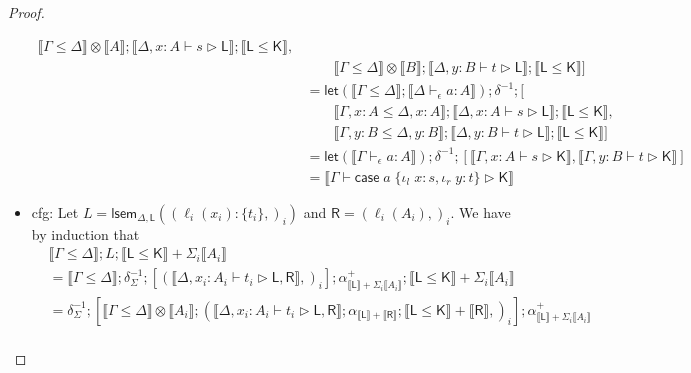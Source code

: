 \documentclass[acmsmall,screen,review]{acmart}
\newcommand{\ms}[1]{\ensuremath{\mathsf{#1}}}
\newcommand{\lto}{:}
\newcommand{\linl}[1]{\iota_l\;{#1}}
\newcommand{\linr}[1]{\iota_r\;{#1}}
\newcommand{\caseexpr}[5]{\ms{case}\;#1\;\{\linl{#2} \lto #3, \linr{#4} \lto #5\}}
\newcommand{\wbranch}[3]{#1(#2) \lto \{#3\}}
\newcommand{\bhyp}[2]{#1 : #2}
\newcommand{\hasty}[4]{#1 \vdash_{#2} #3: {#4}}
\newcommand{\haslb}[3]{#1 \vdash #2 \rhd #3}
\newcommand{\brle}[1]{{\textsf{#1}}}
\newcommand{\dnt}[1]{\llbracket{#1}\rrbracket}
\newcommand{\loopmor}[3]{\ms{lsem}_{#1, #3}(#2)}
\newcommand{\lmor}[1]{\ms{let}(#1)}
\begin{document}
\begin{proof}
\begin{itemize}
\begin{equation}
\begin{aligned}
             \dnt{\Gamma \leq \Delta} \otimes \dnt{A}
               ; \dnt{\haslb{\Delta, \bhyp{x}{A}}{s}{\ms{L}}}
               ; \dnt{\ms{L} \leq \ms{K}}, \\ & \qquad
             \dnt{\Gamma \leq \Delta} \otimes \dnt{B}
               ; \dnt{\haslb{\Delta, \bhyp{y}{B}}{t}{\ms{L}}}
               ; \dnt{\ms{L} \leq \ms{K}}
          ] \\
        & = \lmor{\dnt{\Gamma \leq \Delta} ; \dnt{\hasty{\Delta}{\epsilon}{a}{A}}}
           ; \delta^{-1}
           ; [ \\ & \qquad 
              \dnt{\Gamma, \bhyp{x}{A} \leq \Delta, \bhyp{x}{A}}
                ; \dnt{\haslb{\Delta, \bhyp{x}{A}}{s}{\ms{L}}}
                ; \dnt{\ms{L} \leq \ms{K}}, \\ & \qquad
              \dnt{\Gamma, \bhyp{y}{B} \leq \Delta, \bhyp{y}{B}}
                ; \dnt{\haslb{\Delta, \bhyp{y}{B}}{t}{\ms{L}}}
                ; \dnt{\ms{L} \leq \ms{K}}
           ]
            \\
        & = \lmor{\dnt{\hasty{\Gamma}{\epsilon}{a}{A}}}
          ; \delta^{-1}
          ; [ 
            \dnt{\haslb{\Gamma, \bhyp{x}{A}}{s}{\ms{K}}},
            \dnt{\haslb{\Gamma, \bhyp{y}{B}}{t}{\ms{K}}}
          ] \\
        & = \dnt{\haslb{\Gamma}{\caseexpr{a}{x}{s}{y}{t}}{\ms{K}}}
      \end{aligned}
    \end{equation}
    \item \brle{cfg}: Let $L = \loopmor{\Delta}{(\wbranch{\ell_i}{x_i}{t_i},)_i}{\ms{L}}$ and
    $\ms{R} = (\ell_i(A_i),)_i$. We have by induction that
    \begin{equation}
      \begin{aligned}
        & \dnt{\Gamma \leq \Delta} ; L ; \dnt{\ms{L} \leq \ms{K}} + \Sigma_i\dnt{A_i} \\
        & = \dnt{\Gamma \leq \Delta} 
          ; \delta^{-1}_{\Sigma}
          ; [(\dnt{\haslb{\Delta, \bhyp{x_i}{A_i}}{t_i}{\ms{L}, \ms{R}}},)_i]
          ; \alpha^+_{\dnt{\ms{L}} + \Sigma_i\dnt{A_i}}
          ; \dnt{\ms{L} \leq \ms{K}} + \Sigma_i\dnt{A_i} \\
        & = \delta^{-1}_{\Sigma}
          ; [
            \dnt{\Gamma \leq \Delta} \otimes \dnt{A_i}
            ; (\dnt{\haslb{\Delta, \bhyp{x_i}{A_i}}{t_i}{\ms{L}, \ms{R}}}
            ; \alpha_{\dnt{\ms{L}} + \dnt{\ms{R}}}
            ; \dnt{\ms{L} \leq \ms{K}} + \dnt{\ms{R}},)_i]
          ; \alpha^+_{\dnt{\ms{L}} + \Sigma_i\dnt{A_i}} \\

\end{aligned}
\end{equation}
\end{itemize}
\end{proof}
\end{document}
